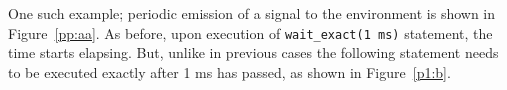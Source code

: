 One such example; periodic emission of a signal to the environment is
shown in Figure~\ref{pp:aa}. As before, upon execution of
\texttt{wait\_exact(1 ms)} statement, the time starts elapsing. But,
unlike in previous cases the following statement needs to be executed
exactly after 1 ms has passed, as shown in Figure~\ref{p1:b}.



